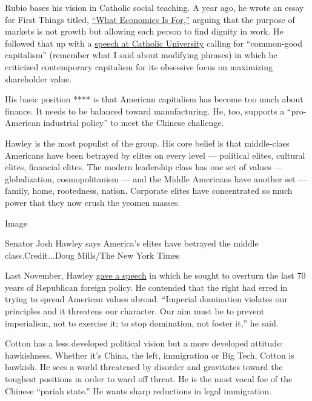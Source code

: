 Rubio bases his vision in Catholic social teaching. A year ago, he wrote
an essay for First Things titled,
\href{https://www.firstthings.com/web-exclusives/2019/08/what-economics-is-for}{``What
Economics Is For,''} arguing that the purpose of markets is not growth
but allowing each person to find dignity in work. He followed that up
with a
\href{https://www.rubio.senate.gov/public/_cache/files/6d09ae19-8df3-4755-b301-795154a68c59/C58480B07D02452574C5DB8D603803EF.final---cua-speech-11.5.19.pdf}{speech
at Catholic University} calling for ``common-good capitalism'' (remember
what I said about modifying phrases) in which he criticized contemporary
capitalism for its obsessive focus on maximizing shareholder value.

His basic position **** is that American capitalism has become too much
about finance. It needs to be balanced toward manufacturing. He, too,
supports a ``pro-American industrial policy'' to meet the Chinese
challenge.

Hawley is the most populist of the group. His core belief is that
middle-class Americans have been betrayed by elites on every level ---
political elites, cultural elites, financial elites. The modern
leadership class has one set of values --- globalization,
cosmopolitanism --- and the Middle Americans have another set ---
family, home, rootedness, nation. Corporate elites have concentrated so
much power that they now crush the yeomen masses.

Image

Senator Josh Hawley says America's elites have betrayed the middle
class.Credit...Doug Mills/The New York Times

Last November, Hawley
\href{https://www.hawley.senate.gov/senator-hawleys-speech-rethinking-americas-foreign-policy-consensus}{gave
a speech} in which he sought to overturn the last 70 years of Republican
foreign policy. He contended that the right had erred in trying to
spread American values abroad. ``Imperial domination violates our
principles and it threatens our character. Our aim must be to prevent
imperialism, not to exercise it; to stop domination, not foster it,'' he
said.

Cotton has a less developed political vision but a more developed
attitude: hawkishness. Whether it's China, the left, immigration or Big
Tech, Cotton is hawkish. He sees a world threatened by disorder and
gravitates toward the toughest positions in order to ward off threat. He
is the most vocal foe of the Chinese ``pariah state.'' He wants sharp
reductions in legal immigration.

